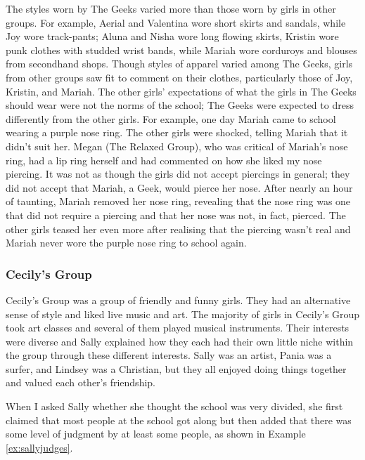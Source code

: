 The styles worn by The Geeks varied more than those worn by girls in other groups. For example, Aerial and Valentina wore short skirts and sandals, while Joy wore track-pants; Aluna and Nisha wore long flowing skirts, Kristin wore punk clothes with studded wrist bands, while Mariah wore corduroys and blouses from secondhand shops. Though styles of apparel varied among The Geeks, girls from other groups saw fit to comment on their clothes, particularly those of Joy, Kristin, and Mariah. The other girls' expectations of what the girls in The Geeks should wear were not the norms of the school; The Geeks were expected to dress differently from the other girls. For example, one day Mariah came to school wearing a purple nose ring. The other girls were shocked, telling Mariah that it didn't suit her. Megan (The Relaxed Group), who was critical of Mariah's nose ring, had a lip ring herself and had commented on how she liked my nose piercing. It was not as though the girls did not accept piercings in general; they did not accept that Mariah, a Geek, would pierce her nose. After nearly an hour of taunting, Mariah removed her nose ring, revealing that the nose ring was one that did not require a piercing and that her nose was not, in fact, pierced. The other girls teased her even more after realising that the piercing wasn't real and Mariah never wore the purple nose ring to school again. 


\subsubsection{Cecily's Group}

Cecily's Group was a group of friendly and funny girls. They had an alternative sense of style and liked live music and art. The majority of girls in Cecily's Group took art classes and several of them played musical instruments. Their interests were diverse and Sally explained how they each had their own little niche within the group through these different interests. Sally was an artist, Pania was a surfer, and Lindsey was a Christian, but they all enjoyed doing things together and valued each other's friendship.

When I asked Sally whether she thought the school was very divided, she first claimed that most people at the school got along but then added that there was some level of judgment by at least some people, as shown in Example \ref{ex:sallyjudges}.


